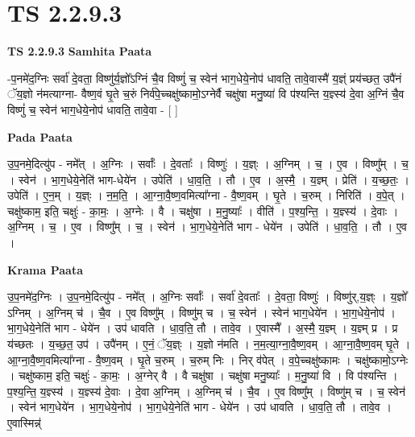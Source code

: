 \documentclass[17pt]{extarticle}
\begin{document}
\section{ TS 2.2.9.3 }

\textbf{TS 2.2.9.3 } \newline
\textbf{Samhita Paata} \newline

-प॒नमे॑द॒ग्निः सर्वा॑ दे॒वता॒ विष्णु॑र्य॒ज्ञो᳚ऽग्निं चै॒व विष्णुं॑ च॒ स्वेन॑ भाग॒धेये॒नोप॑ धावति॒ तावे॒वास्मै॑ य॒ज्ञ्ं प्रय॑च्छत॒ उपै॑नं ॅय॒ज्ञो न॑मत्याग्ना- वैष्ण॒वं घृ॒ते च॒रुं निर्व॑पे॒च्चक्षु॑ष्कामो॒ऽग्नेर्वै चक्षु॑षा मनु॒ष्या॑ वि प॑श्यन्ति य॒ज्ञ्स्य॑ दे॒वा अ॒ग्निं चै॒व विष्णुं॑ च॒ स्वेन॑ भाग॒धेये॒नोप॑ धावति॒ तावे॒वा - [  ] \newline

\textbf{Pada Paata} \newline

उ॒प॒नमे॒दित्यु॑प - नमे᳚त् । अ॒ग्निः । सर्वाः᳚ । दे॒वताः᳚ । विष्णुः॑ । य॒ज्ञ्ः । अ॒ग्निम् । च॒ । ए॒व । विष्णु᳚म् । च॒ । स्वेन॑ । भा॒ग॒धेये॒नेति॑ भाग-धेये॑न । उपेति॑ । धा॒व॒ति॒ । तौ । ए॒व । अ॒स्मै॒ । य॒ज्ञ्म् । प्रेति॑ । य॒च्छ॒तः॒ । उपेति॑ । ए॒न॒म् । य॒ज्ञ्ः । न॒म॒ति॒ । आ॒ग्ना॒वै॒ष्ण॒वमित्या᳚ग्ना - वै॒ष्ण॒वम् । घृ॒ते । च॒रुम् । निरिति॑ । व॒पे॒त् । चक्षु॑ष्काम॒ इति॒ चक्षुः॑ - का॒मः॒ । अ॒ग्नेः । वै । चक्षु॑षा । म॒नु॒ष्याः᳚ । वीति॑ । प॒श्य॒न्ति॒ । य॒ज्ञ्स्य॑ । दे॒वाः । अ॒ग्निम् । च॒ । ए॒व । विष्णु᳚म् । च॒ । स्वेन॑ । भा॒ग॒धेये॒नेति॑ भाग - धेये॑न । उपेति॑ । धा॒व॒ति॒ । तौ । ए॒व ।  \newline


\textbf{Krama Paata} \newline

उ॒प॒नमे॑द॒ग्निः । उ॒प॒नमे॒दित्यु॑प - नमे᳚त् । अ॒ग्निः सर्वाः᳚ । सर्वा॑ दे॒वताः᳚ । दे॒वता॒ विष्णुः॑ । विष्णु॑र्,य॒ज्ञ्ः । य॒ज्ञो᳚ ऽग्निम् । अ॒ग्निम् च॑ । चै॒व । ए॒व विष्णु᳚म् । विष्णु॑म् च । च॒ स्वेन॑ । स्वेन॑ भाग॒धेये॑न । भा॒ग॒धेये॒नोप॑ । भा॒ग॒धेये॒नेति॑ भाग - धेये॑न । उप॑ धावति । धा॒व॒ति॒ तौ । तावे॒व । ए॒वास्मै᳚ । अ॒स्मै॒ य॒ज्ञ्म् । य॒ज्ञ्म् प्र । प्र य॑च्छतः । य॒च्छ॒त॒ उप॑ । उपै॑नम् । ए॒नं॒ ॅय॒ज्ञ्ः । य॒ज्ञो न॑मति । न॒म॒त्या॒ग्ना॒वै॒ष्ण॒वम् । आ॒ग्ना॒वै॒ष्ण॒वम् घृ॒ते । आ॒ग्ना॒वै॒ष्ण॒वमित्या᳚ग्ना - वै॒ष्ण॒वम् । घृ॒ते च॒रुम् । च॒रुम् निः । निर् व॑पेत् । व॒पे॒च्चक्षु॑ष्कामः । चक्षु॑ष्कामो॒ऽग्नेः । चक्षु॑ष्काम॒ इति॒ चक्षुः॑ - का॒मः॒ । अ॒ग्नेर् वै । वै चक्षु॑षा । चक्षु॑षा मनु॒ष्याः᳚ । म॒नु॒ष्या॑ वि । वि प॑श्यन्ति । प॒श्य॒न्ति॒ य॒ज्ञ्स्य॑ । य॒ज्ञ्स्य॑ दे॒वाः । दे॒वा अ॒ग्निम् । अ॒ग्निम् च॑ । चै॒व । ए॒व विष्णु᳚म् । विष्णु॑म् च । च॒ स्वेन॑ । स्वेन॑ भाग॒धेये॑न । भा॒ग॒धेये॒नोप॑ । भा॒ग॒धेये॒नेति॑ भाग - धेये॑न । उप॑ धावति । धा॒व॒ति॒ तौ । तावे॒व । ए॒वास्मिन्न्॑ \newline
\end{document}
